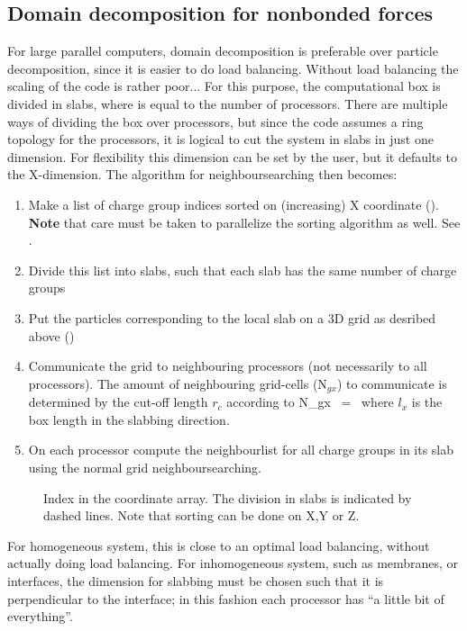 \subsection{Domain decomposition for nonbonded forces}
For large parallel computers, domain decomposition is preferable over particle
decomposition, since it is easier to do load balancing. Without load balancing
the scaling of the code is rather poor...
For this purpose, the computational box is divided in {\nproc} slabs, where {\nproc}
is equal to the number of processors. There are multiple ways of dividing the box
over processors, but since the {\gromacs} code assumes
a ring topology for the processors, it is logical to cut the system in slabs in
just one dimension. For flexibility this dimension can be set by the user,
but it defaults to the X-dimension.
The algorithm for neighboursearching then becomes:
\begin{enumerate}
\item	Make a list of charge group indices sorted on (increasing) X coordinate
	().
	{\bf Note} that care must be taken to parallelize the sorting algorithm
	as well. See .
\item	Divide this list into slabs, such that each slab has the same number of
	charge groups
\item	Put the particles corresponding to the local slab on a 3D grid as 
	desribed above ()
\item	Communicate the grid to neighbouring processors (not necessarily to all
	processors). The amount of neighbouring grid-cells (N$_{gx}$) to 
	communicate is determined by the cut-off length $r_c$ according to
	\beq
	N_{gx}	~=~	   
	\eeq
	where $l_x$ is the box length in the slabbing direction. 
\item	On each processor compute the neighbourlist for all charge groups in
	its slab using the normal grid neighboursearching.
\end{enumerate}

\begin{figure}
\centerline{}
\caption{Index in the coordinate array. The division in slabs is indicated by dashed lines. Note that sorting can be done on X,Y or Z.}
\label{fig:parsort}
\end{figure}

For homogeneous system, this is close to an optimal load balancing, without 
actually doing load balancing. For inhomogeneous system, such as membranes, or 
interfaces, the dimension for slabbing must be chosen such that it is perpendicular
to the interface; in this fashion each processor has ``a little bit of everything''.

